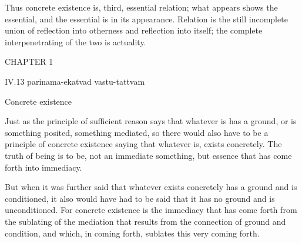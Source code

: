 Thus concrete existence is, third, essential relation;
what appears shows the essential,
and the essential is in its appearance.
Relation is the still incomplete union of
reflection into otherness and reflection into itself;
the complete interpenetrating of the two is actuality.

CHAPTER 1

IV.13
parinama-ekatvad vastu-tattvam

Concrete existence

Just as the principle of sufficient reason says
that whatever is has a ground,
or is something posited, something mediated,
so there would also have to be
a principle of concrete existence saying
that whatever is, exists concretely.
The truth of being is to be, not an immediate something,
but essence that has come forth into immediacy.

But when it was further said
that whatever exists concretely
has a ground and is conditioned,
it also would have had to be said
that it has no ground and is unconditioned.
For concrete existence is the immediacy
that has come forth from the sublating
of the mediation that results
from the connection of ground and condition,
and which, in coming forth,
sublates this very coming forth.

